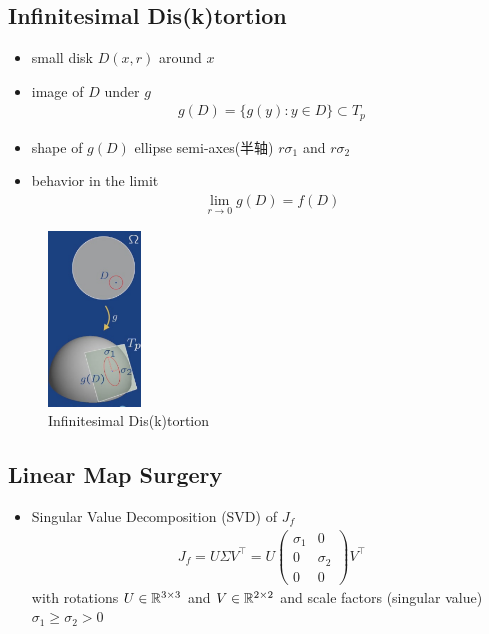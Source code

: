\subsection{Infinitesimal Dis(k)tortion}
\begin{itemize}
    \item small disk $D(x,r)$ around $x$
    \item image of $D$ under $g$
    \begin{align*}
        g(D)=\{ g(y):y\in D \}\subset T_p
    \end{align*}
    \item shape of $g(D)$
    \subitem ellipse
    \subitem semi-axes(半轴) $r\sigma_1$ and $r\sigma_2$
    \item behavior in the limit
    \begin{align*}
        \lim_{r\to 0}g(D)=f(D)
    \end{align*}
\end{itemize}

\begin{figure}[!htb]
    \centering
    \includegraphics[width=0.22\textwidth]{pic/ACG2/Infinitesimal Dis(k)tortion}
    \caption{Infinitesimal Dis(k)tortion}
\end{figure}

\subsection{Linear Map Surgery}
\begin{itemize}
    \item Singular Value Decomposition (SVD) of $J_f$
    \begin{align*}
        J_f= U\Sigma V^\top =U \begin{pmatrix}
            \sigma_1 & 0 \\ 0 & \sigma_2 \\ 0 & 0
        \end{pmatrix}V^\top
    \end{align*}
    with rotations $U\in \mathbb{R}^{3\times 3}$ and $V\in\mathbb{R}^{2\times 2}$ and scale factors (singular value) $\sigma_1\ge \sigma_2>0$
\end{itemize}

